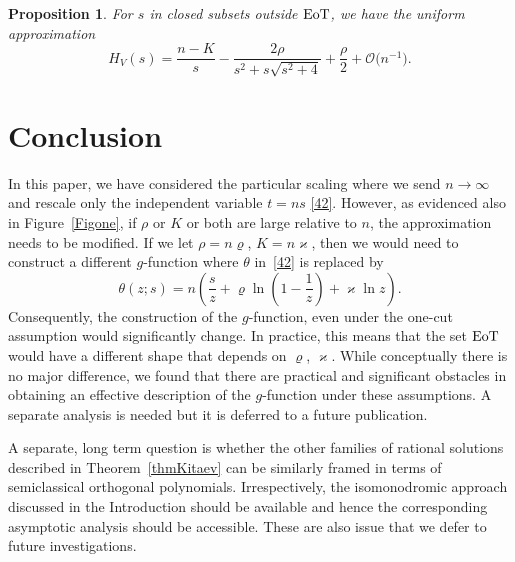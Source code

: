 \documentclass[10pt,a4paper]{amsart}
\numberwithin{equation}{section}
\newtheorem{Proposition}[Theorem]{Proposition}
\theoremstyle{definition}
\def\le{\left}
\def\ri{\right}
\begin{document}
 \begin{Proposition} \label{H_Vapproxout}
 For $s$ in closed subsets outside ${\rm EoT}$, we have the uniform approximation
\[
 H_V(s) = \frac{n-{K}}s
 - \frac {2{\rho}}{s^2 + s \sqrt{s^2+4}}
 +\frac { {\rho}} 2 + \mathcal O\bigl(n^{-1}\bigr).
\]
 \end{Proposition}

\section{Conclusion}
In this paper, we have considered the particular scaling where we send $n\to\infty$ and rescale only the independent variable $t = ns$ \eqref{42}. However, as evidenced also in Figure~\ref{Figone}, if $ {\rho}$ or $ {K}$ or both are large relative to $n$, the approximation needs to be modified.
 If we let $ {\rho} = n \varrho$, $ {K} = n \varkappa$, then we would need to construct a different $g$-function where $\theta$ in~\eqref{42} is replaced by
\[
\theta(z;s) = n\le(\frac s z+ \varrho \ln \le(1-\frac 1 z \ri) + \varkappa \ln z\ri).
\]
Consequently, the construction of the $g$-function, even under the one-cut assumption would significantly change. In practice, this means that the set ${\rm EoT}$ would have a different shape that depends on $\varrho$, $\varkappa$. While conceptually there is no major difference, we found that there are practical and significant obstacles in obtaining an effective description of the $g$-function under these assumptions. A separate analysis is needed but it is deferred to a future publication.

A separate, long term question is whether the other families of rational solutions described in Theorem~\ref{thmKitaev} can be similarly framed in terms of semiclassical orthogonal polynomials. Irrespectively, the isomonodromic approach discussed in the Introduction should be available and hence the corresponding asymptotic analysis should be accessible. These are also issue that we defer to future investigations.

\vspace{-1mm}


\appendix
\end{document}
